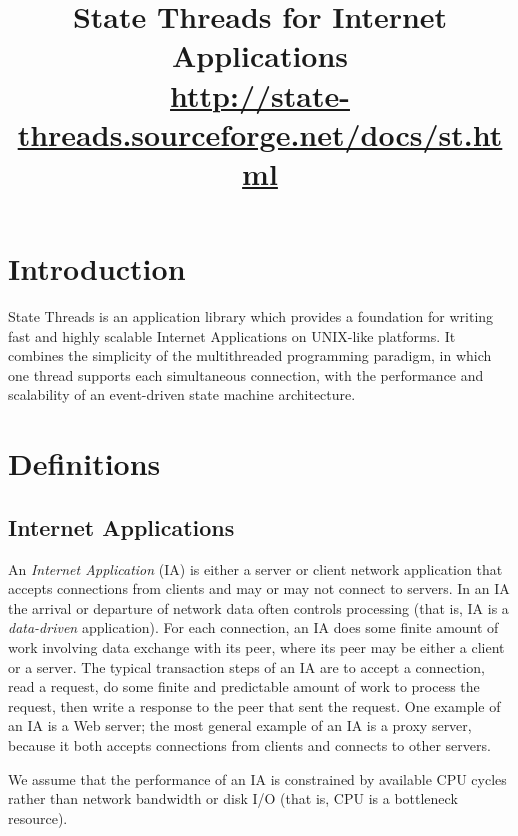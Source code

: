 \documentclass[a4paper,12pt,notitlepage,twoside,openright]{article}
\title{State Threads for Internet Applications\\
\footnotesize{\url{http://state-threads.sourceforge.net/docs/st.html}}}
\author{}
\date{}
\begin{document}
\maketitle

\hypertarget{introduction}{%
\section*{Introduction}\label{introduction}}

State Threads is an application library which provides a foundation for
writing fast and highly scalable Internet Applications on UNIX-like
platforms. It combines the simplicity of the multithreaded programming
paradigm, in which one thread supports each simultaneous connection,
with the performance and scalability of an event-driven state machine
architecture.

\hypertarget{definitions}{%
\section{Definitions}\label{definitions}}

\protect\hypertarget{IA}{}{}

\hypertarget{internet-applications}{%
\subsection{Internet Applications}\label{internet-applications}}

An \emph{Internet Application} (IA) is either a server or client network
application that accepts connections from clients and may or may not
connect to servers. In an IA the arrival or departure of network data
often controls processing (that is, IA is a \emph{data-driven}
application). For each connection, an IA does some finite amount of work
involving data exchange with its peer, where its peer may be either a
client or a server. The typical transaction steps of an IA are to accept
a connection, read a request, do some finite and predictable amount of
work to process the request, then write a response to the peer that sent
the request. One example of an IA is a Web server; the most general
example of an IA is a proxy server, because it both accepts connections
from clients and connects to other servers.

We assume that the performance of an IA is constrained by available CPU
cycles rather than network bandwidth or disk I/O (that is, CPU is a
bottleneck resource).
\end{document}
